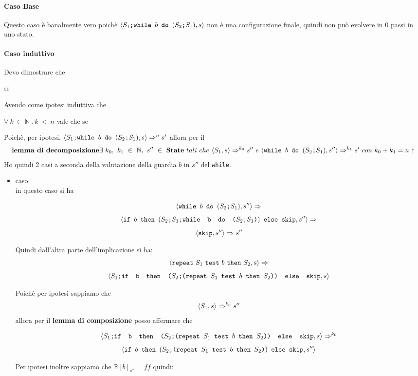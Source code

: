 {   \paragraph{Caso Base}
	 Questo caso è banalmente vero poichè $\confSs{\PDef{}}{s}$
	non è una configurazione finale, quindi non può evolvere in 0 passi in uno
	stato.
    \paragraph{Caso induttivo}
	Devo dimostrare che 
	\begin{center}
	se 
	\end{center}
	Avendo come ipotesi induttiva che 
	\begin{center}
	$\forall{}~k~\in~\mathbb{N}~.~k~<~n$ vale che se 
	\end{center}
	Poichè, per ipotesi, $\confSs{\PDef{}}{s}\Rar{n}s'$ allora per il
	\[ \textbf{lemma di decomposizione} \\ 
	\exists{}~k_0,~k_1~\in~\mathbb{N},~
	s''~\in~\states{}~tali~che~\confSs{S_1}{s}\Rar{k_0}s''~e~\confSs{
	\wbS{b}{(\concat{$S_2$}{$S_1$})}}{s''}\Rar{k_1}s'~con~k_0+k_1=n$  $\dagger  \]
	Ho quindi 2 casi a seconda della valutazione della guardia $b$ in $s''$ del
	\texttt{while}.
	\begin{itemize}
		\item caso  \\
		in questo caso si ha 
		
		\[ \confSs{\wbS{b}{(\concat{$S_2$}{$S_1$})}}{s''}\Rar{} \]
		\[ \confSs{\ifABC{b}{(\concat{\concat{$S_2$}{$S_1$}}
		{\wbS{b}{(\concat{$S_2$}{$S_1$})}})}{\skipistr}}{s''}\Rar{} \]
		\[ \confSs{\skipistr}{s''}\Rar{}s'' \]

		Quindi dall'altra parte dell'implicazione si ha:
		\[ \confSs{\repeatSbS{S_1}{b}{S_2}}{s}\Rar{} \]
		\[ \confSs{\concat{$S_1$}{\ifABC{b}{(\concat{$S_2$}
		{(\repeatSbS{$S_1$}{$b$}{$S_2$})})}{\skipistr}}}{s} \]

		Poichè per ipotesi sappiamo che
		\[  \confSs{S_1}{s}\Rar{k_0}s'' \] allora
		per il \textbf{lemma di composizione} posso affermare che

		\[ \confSs{\concat{$S_1$}{\ifABC{b}{(\concat{$S_2$}
		{(\repeatSbS{$S_1$}{$b$}{$S_2$})})}{\skipistr}}}{s}\Rar{k_0} \]
		\[ \confSs{
			\ifABC{b}{(\concat{$S_2$}{(\repeatSbS{$S_1$}{$b$}{$S_2$})})} 
			{\skipistr}}{s''} \]

		Per ipotesi inoltre sappiamo che $\mathbb{B}[b]_{s''}=ff$ quindi:
	

\end{itemize}}
